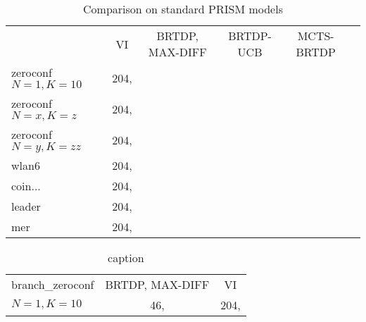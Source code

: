 \begin{landscape}

\begin{table}
\begin{tabularx}{\textwidth}{ l  | c | c | c | c | c }
     & VI          &  BRTDP, MAX-DIFF   & BRTDP-UCB & MCTS-BRTDP \\
zeroconf $N=1, K=10$ &        204, &   \\
zeroconf $N=x, K=z$ &        204, &   \\
zeroconf $N=y, K=zz$ &        204, &   \\
wlan6 &        204, &   \\
coin... &        204, &   \\
leader &        204, &   \\
mer &        204, &   \\
\end{tabularx}
\caption{Comparison on standard PRISM models}
\label{table:general_comparison}
\end{table}

\begin{table}
\begin{tabularx}{\textwidth}{ l  | c | c  }
branch\_zeroconf &  BRTDP, MAX-DIFF   &   VI      \\
$N=1, K=10$      &               46,  &       204, \\
\end{tabularx}
\caption{caption}
\label{table:branch_zconf}
\end{table}

\end{landscape}







